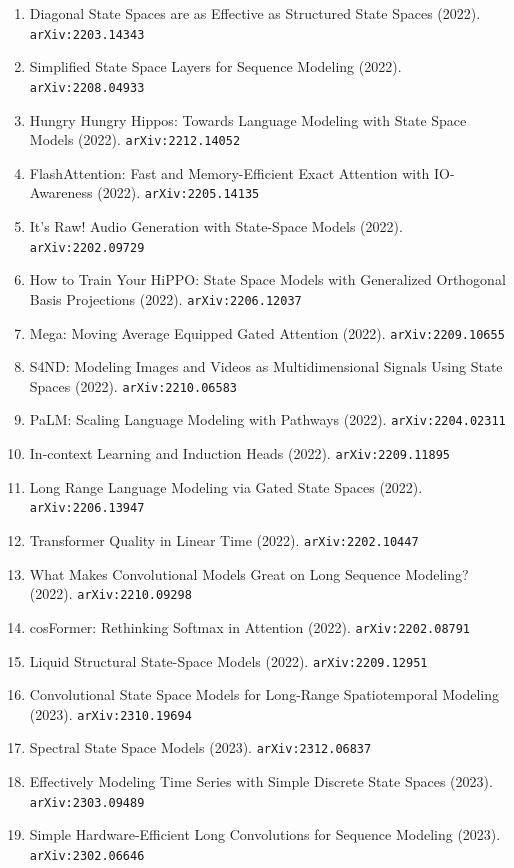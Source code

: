 \documentclass[11pt]{article}
\begin{document}
\begin{enumerate}
  \item Diagonal State Spaces are as Effective as Structured State Spaces (2022). \texttt{arXiv:2203.14343}
  \item Simplified State Space Layers for Sequence Modeling (2022). \texttt{arXiv:2208.04933}
  \item Hungry Hungry Hippos: Towards Language Modeling with State Space Models (2022). \texttt{arXiv:2212.14052}
  \item FlashAttention: Fast and Memory-Efficient Exact Attention with
  IO-Awareness (2022). \texttt{arXiv:2205.14135}
  \item It's Raw! Audio Generation with State-Space Models (2022). \texttt{arXiv:2202.09729}
  \item How to Train Your HiPPO: State Space Models with Generalized Orthogonal
  Basis Projections (2022). \texttt{arXiv:2206.12037}
  \item Mega: Moving Average Equipped Gated Attention (2022). \texttt{arXiv:2209.10655}
  \item S4ND: Modeling Images and Videos as Multidimensional Signals Using State
  Spaces (2022). \texttt{arXiv:2210.06583}
  \item PaLM: Scaling Language Modeling with Pathways (2022). \texttt{arXiv:2204.02311}
  \item In-context Learning and Induction Heads (2022). \texttt{arXiv:2209.11895}
  \item Long Range Language Modeling via Gated State Spaces (2022). \texttt{arXiv:2206.13947}
  \item Transformer Quality in Linear Time (2022). \texttt{arXiv:2202.10447}
  \item What Makes Convolutional Models Great on Long Sequence Modeling? (2022). \texttt{arXiv:2210.09298}
  \item cosFormer: Rethinking Softmax in Attention (2022). \texttt{arXiv:2202.08791}
  \item Liquid Structural State-Space Models (2022). \texttt{arXiv:2209.12951}
  \item Convolutional State Space Models for Long-Range Spatiotemporal Modeling (2023). \texttt{arXiv:2310.19694}
  \item Spectral State Space Models (2023). \texttt{arXiv:2312.06837}
  \item Effectively Modeling Time Series with Simple Discrete State Spaces (2023). \texttt{arXiv:2303.09489}
  \item Simple Hardware-Efficient Long Convolutions for Sequence Modeling (2023). \texttt{arXiv:2302.06646}

\end{enumerate}
\end{document}
